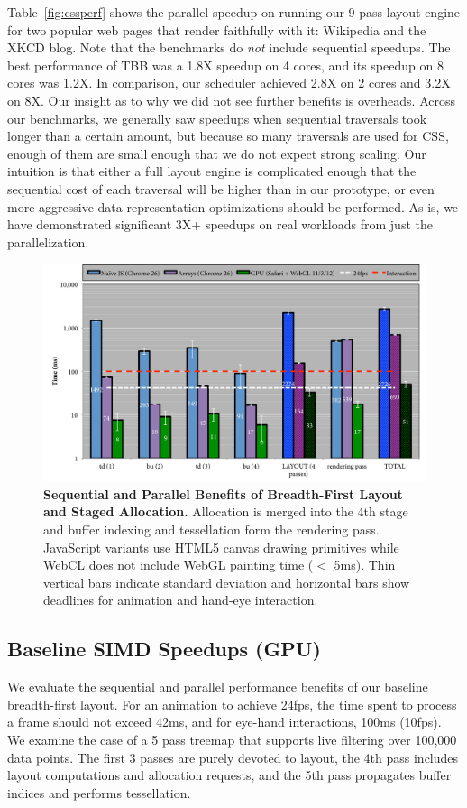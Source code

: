 Table~\ref{fig:cssperf} shows the parallel speedup on running our 9 pass layout engine for two popular web pages that render faithfully with it: Wikipedia and the XKCD blog. Note that the benchmarks do \emph{not} include sequential speedups. The best performance of TBB was a 1.8X speedup on 4 cores, and its speedup on 8 cores was 1.2X. In comparison, our scheduler achieved 2.8X on 2 cores and 3.2X on 8X. Our insight as to why we did not see further benefits is overheads. Across our benchmarks, we generally saw speedups when sequential traversals took longer than a certain amount, but because so many traversals are used for CSS, enough of them are small enough that we do not expect strong scaling. Our intuition is that either a full layout engine is complicated enough that the sequential cost of each traversal will be higher than in our prototype, or even more aggressive data representation optimizations should be performed. As is, we have demonstrated significant 3X+ speedups on real workloads from just the parallelization.


\begin{figure}
\centering
\includegraphics[trim=0 0 0 0,clip,width=1.0\columnwidth]{chapter6/gpuspeedup}
\caption{\textbf{Sequential and Parallel Benefits of Breadth-First Layout and Staged Allocation.} Allocation is merged into the 4th stage and buffer indexing and tessellation form the rendering pass. JavaScript variants use HTML5 canvas drawing primitives while WebCL does not include WebGL painting time ($<$ 5ms). Thin vertical bars indicate standard deviation and horizontal bars show deadlines for animation and hand-eye interaction.}
\label{fig:treemapjsgpu}
\end{figure}


\subsection{Baseline SIMD Speedups (GPU)}
We evaluate the sequential and parallel performance benefits of our baseline breadth-first layout.   For an animation to achieve 24fps, the time spent to process a frame should not exceed 42ms, and for eye-hand interactions, 100ms (10fps). We examine the case of a 5 pass treemap that supports live filtering over 100,000 data points. The first 3 passes are purely devoted to layout, the 4th pass includes layout computations and allocation requests, and the 5th pass propagates buffer indices and performs tessellation. 

